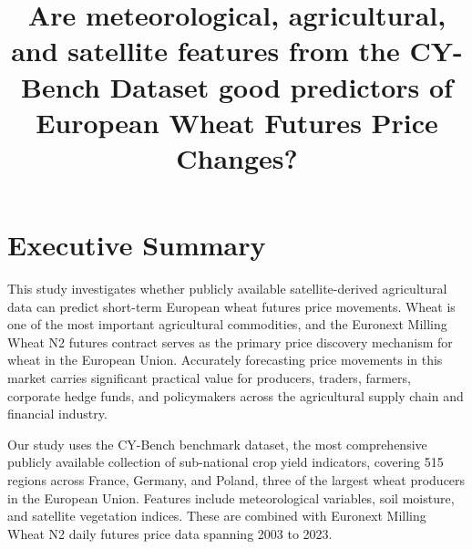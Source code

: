 \documentclass[pdflatex,sn-mathphys-num, oneside]{sn-jnl}%
\theoremstyle{thmstyleone}%
\theoremstyle{thmstyletwo}%
\theoremstyle{thmstylethree}%
\begin{document}
\title[Article Title]{Are meteorological, agricultural, and satellite features from the CY-Bench Dataset good predictors of European Wheat Futures Price Changes?}


\author{}
\author{}
\author{}



\maketitle

\clearpage

\section{Executive Summary}\label{sec1}
This study investigates whether publicly available satellite-derived agricultural data can predict short-term European wheat futures price movements. Wheat is one of the most important agricultural commodities, and the Euronext Milling Wheat N2 futures contract serves as the primary price discovery mechanism for wheat in the European Union. Accurately forecasting price movements in this market carries significant practical value for producers, traders, farmers, corporate hedge funds, and policymakers across the agricultural supply chain and financial industry. 

Our study uses the CY-Bench benchmark dataset, the most comprehensive publicly available collection of sub-national crop yield indicators, covering 515 regions across France, Germany, and Poland, three of the largest wheat producers in the European Union. Features include meteorological variables, soil moisture, and satellite vegetation indices. These are combined with Euronext Milling Wheat N2 daily futures price data spanning 2003 to 2023.
\end{document}
